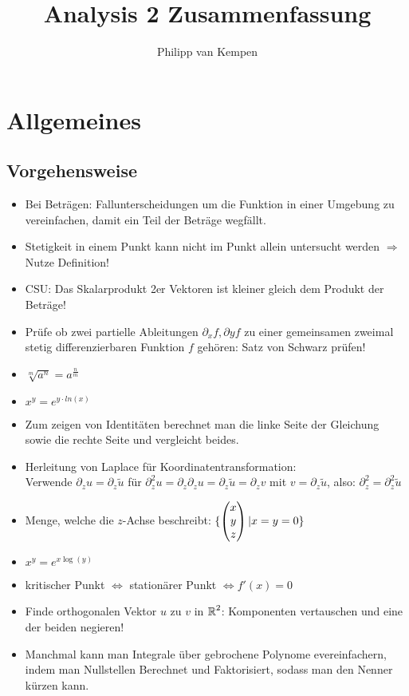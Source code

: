 \documentclass[german]{latex4ei/latex4ei_sheet}
\title{Analysis 2 Zusammenfassung}
\author{Philipp van Kempen}					%
\begin{document}
\maketitle	%


\newcommand{\Lim}[1]{\raisebox{0.5ex}{\scalebox{0.8}{$\displaystyle \lim_{#1}\;$}}}

\section{Allgemeines}
\subsection*{Vorgehensweise}
\begin{itemize}
\item Bei Betr\"agen: Fallunterscheidungen um die Funktion in einer Umgebung zu vereinfachen, damit ein Teil der Betr\"age wegfällt.
\item Stetigkeit in einem Punkt kann nicht im Punkt allein untersucht werden $\Rightarrow$ Nutze Definition!
\item CSU: Das Skalarprodukt 2er Vektoren ist kleiner gleich dem Produkt der Betr\"age!
\item Pr\"ufe ob zwei partielle Ableitungen $\partial_x f, \partial y f$ zu einer gemeinsamen zweimal stetig differenzierbaren Funktion $f$ geh\"oren: Satz von Schwarz pr\"ufen!\\
\item $\sqrt[m]{a^n} = a^{\frac{n}{m}}$\\
\item $x^y=e^{y \cdot ln(x)}$\\
\item Zum zeigen von Identit\"aten berechnet man die linke Seite der Gleichung sowie die rechte Seite und vergleicht beides.
\item Herleitung von Laplace f\"ur Koordinatentransformation:\\
Verwende $\partial_z u=\partial_z \tilde{u}$ f\"ur $\partial_z^2 u=\partial_z \partial_z u =\partial_z \tilde{u}=\partial_z v$ mit $v=\partial_z \tilde{u}$, also: $\partial_z^2=\partial_z^2 \tilde{u}$
\item Menge, welche die $z$-Achse beschreibt: $\{\begin{pmatrix} x \\ y \\ z \end{pmatrix} | x=y=0\}$
\item $x^y=e^{x \log(y)}$
\item kritischer Punkt $\Leftrightarrow$ station\"arer Punkt $\Leftrightarrow f'(x)=0$
\item Finde orthogonalen Vektor $u$ zu $v$ in $\operatorname{\mathbb R}^2$: Komponenten vertauschen und eine der beiden negieren!
\item Manchmal kann man Integrale \"uber gebrochene Polynome evereinfachern, indem man Nullstellen Berechnet und Faktorisiert, sodass man den Nenner k\"urzen kann.


\end{itemize}
\end{document}
